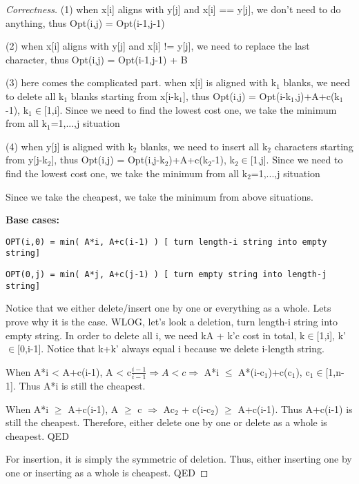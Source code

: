 \documentclass[openany]{article}
\begin{document}
\begin{proof}[Correctness]{}
    (1) when x[i] aligns with y[j] and x[i] == y[j], we don't need to do anything, thus Opt(i,j) = Opt(i-1,j-1)
    
    (2) when x[i] aligns with y[j] and x[i] != y[j], we need to replace the last character, thus Opt(i,j) = Opt(i-1,j-1) + B
    
    (3) here comes the complicated part. when x[i] is aligned with k$_1$ blanks, we need to delete all k$_1$ blanks starting from x[i-k$_1$], thus Opt(i,j) = Opt(i-k$_1$,j)+A+c(k$_1$-1), k$_1\in$[1,i]. Since we need to find the lowest cost one, we take the minimum from all k$_1$=1,...,j situation
    
    (4) when y[j] is aligned with k$_2$ blanks, we need to insert all k$_2$ characters starting from y[j-k$_2$], thus Opt(i,j) = Opt(i,j-k$_2$)+A+c(k$_2$-1), k$_2\in$[1,j]. Since we need to find the lowest cost one, we take the minimum from all k$_2$=1,...,j situation
    
    Since we take the cheapest, we take the minimum from above situations.
    
   \textbf{Base cases:}
   \begin{center}
        \texttt{OPT(i,0) = min( A*i, A+c(i-1) ) [ turn length-i string into empty string]}
        
        \texttt{OPT(0,j) = min( A*j, A+c(j-1) ) [ turn empty string into length-j string]}
        
   \end{center}
   
        Notice that we either delete/insert one by one or everything as a whole. Lets prove why it is the case. WLOG, let's look a deletion, turn length-i string into empty string. In order to delete all i, we need kA + k'c cost in total, k$\in$[1,i], k'$\in$[0,i-1]. Notice that k+k' always equal i because we delete i-length string. 
        
        When A*i < A+c(i-1), A < c$\frac{i-1}{i-1} \Rightarrow A < c \Rightarrow$ A*i $\leq$ A*(i-c$_1$)+c(c$_1$), c$_1 \in$[1,n-1]. Thus A*i is still the cheapest.
        
        When A*i $\geq$ A+c(i-1), A $\geq$ c $\Rightarrow$ Ac$_2$ + c(i-c$_2$) $\geq$ A+c(i-1). Thus A+c(i-1) is still the cheapest. Therefore, either delete one by one or delete as a whole is cheapest. QED
        
        For insertion, it is simply the symmetric of deletion. Thus, either inserting one by one or inserting as a whole is cheapest. QED


\end{proof}
\end{document}
